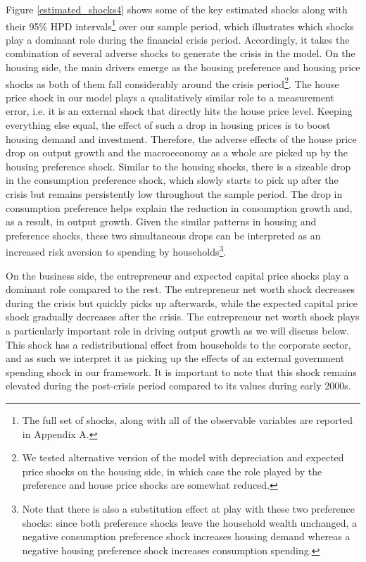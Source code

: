 \documentclass[12pt]{article}
\numberwithin{equation}{section}
\begin{document}
Figure \ref{estimated_shocks4} shows some of the key estimated shocks along with their 95\% HPD intervals\footnote{The full set of shocks, along with all of the observable variables are reported in Appendix A.} over our sample period, which illustrates which shocks play a dominant role during the financial crisis period. Accordingly, it takes the combination of several adverse shocks to generate the crisis in the model. On the housing side, the main drivers emerge as the housing preference and housing price shocks as both of them fall considerably around the crisis period\footnote{We tested alternative version of the model with depreciation and expected price shocks on the housing side, in which case the role played by the preference and house price shocks are somewhat reduced.}. The house price shock in our model plays a qualitatively similar role to a measurement error, i.e. it is an external shock that directly hits the house price level. Keeping everything else equal, the effect of such a drop in housing prices is to boost housing demand and investment. Therefore, the adverse effects of the house price drop on output growth and the macroeconomy as a whole are picked up by the housing preference shock. Similar to the housing shocks, there is a sizeable drop in the consumption preference shock, which slowly starts to pick up after the crisis but remains persistently low throughout the sample period. The drop in consumption preference helps explain the reduction in consumption growth and, as a result, in output growth. Given the similar patterns in housing and preference shocks, these two simultaneous drops can be interpreted as an increased risk aversion to spending by households\footnote{Note that there is also a substitution effect at play with these two preference shocks: since both preference shocks leave the household wealth unchanged, a negative consumption preference shock increases housing demand whereas a negative housing preference shock increases consumption spending.}. 

On the business side, the entrepreneur and expected capital price shocks play a dominant role compared to the rest. The entrepreneur net worth shock decreases during the crisis but quickly picks up afterwards, while the expected capital price shock gradually decreases after the crisis. The entrepreneur net worth shock plays a particularly important role in driving output growth as we will discuss below. This shock has a redistributional effect from households to the corporate sector, and as such we interpret it as picking up the effects of an external government spending shock in our framework. It is important to note that this shock remains elevated during the post-crisis period compared to its values during early 2000s. 
\end{document}

